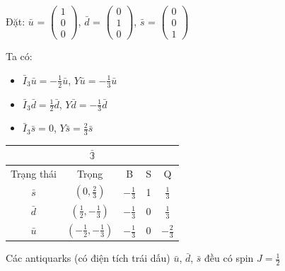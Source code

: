 \documentclass{report}
\begin{document}
Đặt: \( \bar{u} \) = \( \begin{pmatrix}
			1 \\ 0 \\ 0
		\end{pmatrix} \), \( \bar{d} \) = \( \begin{pmatrix}
			0 \\ 1 \\ 0
		\end{pmatrix} \), \( \bar{s} \) = \( \begin{pmatrix}
			0 \\ 0 \\ 1
		\end{pmatrix} \)
		
Ta có:

	\begin{itemize}
		\item \( \bar{I}_{3} \bar{u} = - \frac{1}{2} \bar{u} \), \hspace*{0.5cm} \( Y \bar{u} = - \frac{1}{3}	\bar{u} \)
		\item \( \bar{I}_{3} \bar{d} = \frac{1}{2} \bar{d} \), \hspace*{0.7cm} \( Y \bar{d} = - \frac{1}{3}	\bar{d} \)
		\item \( \bar{I}_{3} \bar{s} = 0 \), \hspace*{1cm} \( Y \bar{s} = \frac{2}{3}	\bar{s} \)
	\end{itemize}			
	
	\begin{center}
		\begin{tabular}{ |c|c|c|c|c|  }
			\hline
				\multicolumn{5}{|c|}{\( \bar{\mathbb{3}} \)} \\
			\hline	
 				Trạng thái & Trọng & B & S & Q \\
 			\hline
 				\( \bar{s} \) & \( \left( 0, \frac{2}{3} \right) \) & \( - \frac{1}{3} \) & 1 & \( \frac{1}{3} \) \\ 	
			\hline
 				\( \bar{d} \) & \( \left( \frac{1}{2}, - \frac{1}{3} \right) \) & \( - \frac{1}{3} \) & 0 & \( \frac{1}{3} \) \\ 	
			\hline
				\( \bar{u} \) & \( \left( - \frac{1}{2}, - \frac{1}{3} \right) \) & \( - \frac{1}{3} \) & 0 & \( - \frac{2}{3} \) \\ 	
			\hline
	\end{tabular}
	\end{center}

Các antiquarks (có điện tích trái dấu) \( \bar{u} \), \( \bar{d} \), \( \bar{s} \) đều có spin \( J = \frac{1}{2} \)
\end{document}
